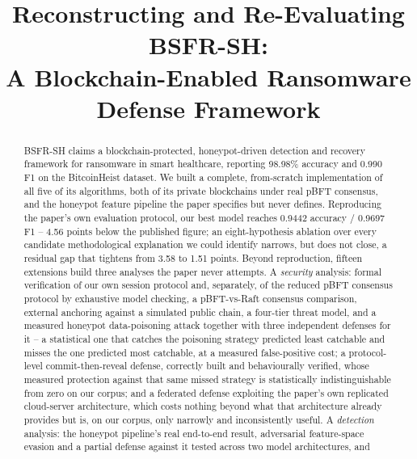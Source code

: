 \documentclass[conference]{IEEEtran}
\begin{document}
\title{Reconstructing and Re-Evaluating BSFR-SH:\\A Blockchain-Enabled Ransomware Defense Framework}

\author{
}

\maketitle

\begin{abstract}
BSFR-SH claims a blockchain-protected, honeypot-driven detection and recovery framework for
ransomware in smart healthcare, reporting 98.98\% accuracy and 0.990 F1 on the BitcoinHeist
dataset. We built a complete, from-scratch implementation of all five of its algorithms, both
of its private blockchains under real pBFT consensus, and the honeypot feature pipeline the
paper specifies but never defines. Reproducing the paper's own evaluation protocol, our best
model reaches 0.9442 accuracy / 0.9697 F1 -- 4.56 points below the published figure; an
eight-hypothesis ablation over every candidate methodological explanation we could identify
narrows, but does not close, a residual gap that tightens from 3.58 to 1.51 points. Beyond
reproduction, fifteen extensions build three analyses the paper never attempts. A
\emph{security} analysis: formal verification of our own session protocol and, separately, of the
reduced pBFT consensus protocol by exhaustive model checking, a pBFT-vs-Raft
consensus comparison, external anchoring against a simulated public chain, a four-tier threat
model, and a measured honeypot data-poisoning attack together with three independent defenses for
it -- a statistical one that catches the poisoning strategy predicted least catchable and misses
the one predicted most catchable, at a measured false-positive cost; a protocol-level
commit-then-reveal defense, correctly built and behaviourally verified, whose measured protection
against that same missed strategy is statistically indistinguishable from zero on our corpus; and
a federated defense exploiting the paper's own replicated cloud-server architecture, which costs
nothing beyond what that architecture already provides but is, on our corpus, only narrowly and
inconsistently useful. A
\emph{detection} analysis: the honeypot pipeline's real end-to-end result, adversarial
feature-space evasion and a partial defense against it tested across two model architectures, and

\end{abstract}
\end{document}
